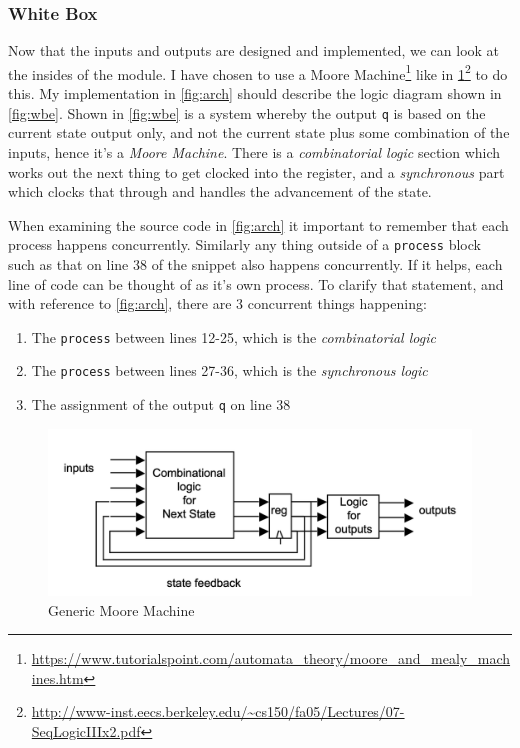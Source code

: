 \documentclass[11pt,a4paper]{article}
\begin{document}
\subsubsection{White Box}
Now that the inputs and outputs are designed and implemented, we can look at the insides of the module. I have chosen to use a Moore Machine\footnote{\url{https://www.tutorialspoint.com/automata_theory/moore_and_mealy_machines.htm}} like in \cref{fig:mm}\footnote{\url{http://www-inst.eecs.berkeley.edu/~cs150/fa05/Lectures/07-SeqLogicIIIx2.pdf}} to do this. My implementation in \cref{fig:arch} should describe the logic diagram shown in \cref{fig:wbe}. Shown in \cref{fig:wbe} is a system whereby the output \texttt{q} is based on the current state output only, and not the current state plus some combination of the inputs, hence it's a \emph{Moore Machine}. There is a \emph{combinatorial logic} section which works out the next thing to get clocked into the register, and a \emph{synchronous} part which clocks that through and handles the advancement of the state.

When examining the source code in \cref{fig:arch} it important to remember that each process happens concurrently. Similarly any thing outside of a \texttt{process} block such as that on line 38 of the snippet also happens concurrently. If it helps, each line of code can be thought of as it's own process. To clarify that statement, and with reference to \cref{fig:arch}, there are 3 concurrent things happening:
\begin{enumerate}
	\item The \texttt{process} between lines 12-25, which is the \emph{combinatorial logic}
	\item The \texttt{process} between lines 27-36, which is the \emph{synchronous logic}
	\item The assignment of the output \texttt{q} on line 38
\end{enumerate}

\begin{figure}
    \begin{center}
        \includegraphics[width=\textwidth]{./src/moore_machine.png}
    \end{center}
    \caption{Generic Moore Machine}
    \label{fig:mm}
\end{figure}
\end{document}
